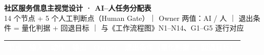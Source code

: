 \documentclass[10pt]{article}
\newcommand{\thd}[1]{\textcolor{white}{\fontsize{11}{13}\selectfont\bfseries #1}}
\begin{document}
{\fontsize{22}{26}\selectfont\bfseries\textcolor{ink}{社区服务信息主视觉设计 · AI–人任务分配表}}\\[2mm]
{\fontsize{10}{12}\selectfont\textcolor{muted}{14 个节点 + 5 个人工判断点（Human Gate）｜ Owner 两值：AI / 人 ｜ 退出条件 = 量化判据 + 回退目标 ｜ 与《工作流程图》N1–N14、G1–G5 逐行对应}}\\[3mm]

\renewcommand{\arraystretch}{2.05}
\setlength{\tabcolsep}{4.5pt}
\begin{tabular}{@{}>{\raggedright\arraybackslash}p{3.7cm}%
>{\raggedright\arraybackslash}p{5.4cm}%
>{\raggedright\arraybackslash}p{7.2cm}%
>{\raggedright\arraybackslash}p{6.3cm}%
>{\centering\arraybackslash}p{1.5cm}%
>{\raggedright\arraybackslash}p{13.4cm}@{}}
\rowcolor{headbg}
\thd{节点} & \thd{输入} & \thd{动作} & \thd{输出} & \thd{Owner} & \thd{退出条件（量化判据 + 回退目标）} \\
\hline


\end{tabular}
\end{document}
